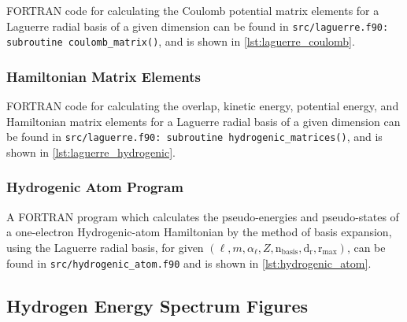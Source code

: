 \documentclass[]{article}
\begin{document}
FORTRAN code for calculating the Coulomb potential matrix elements for a
Laguerre radial basis of a given dimension can be found in
\lstinline[style=ff]{src/laguerre.f90: }\lstinline{subroutine coulomb_matrix()},
and is shown in \autoref{lst:laguerre_coulomb}.



\subsubsection{Hamiltonian Matrix Elements}
\label{sec:hamilt-matr-elem}

FORTRAN code for calculating the overlap, kinetic energy, potential energy, and
Hamiltonian matrix elements for a Laguerre radial basis of a given dimension can
be found in
\lstinline[style=ff]{src/laguerre.f90: }\lstinline{subroutine hydrogenic_matrices()},
and is shown in \autoref{lst:laguerre_hydrogenic}.



\subsubsection{Hydrogenic Atom Program}
\label{sec:hydr-atom-progr}

A FORTRAN program which calculates the pseudo-energies and pseudo-states of a
one-electron Hydrogenic-atom Hamiltonian by the method of basis expansion,
using the Laguerre radial basis, for given
$(\ell, m, \alpha_{\ell}, Z, \mathrm{n_{basis}}, \mathrm{d_{r}},
\mathrm{r_{max}})$, can be found in
\lstinline[style=ff]{src/hydrogenic_atom.f90}
and is shown in \autoref{lst:hydrogenic_atom}.



\subsection{Hydrogen Energy Spectrum Figures}
\label{sec:hydr-atom-progr-1}
\end{document}
